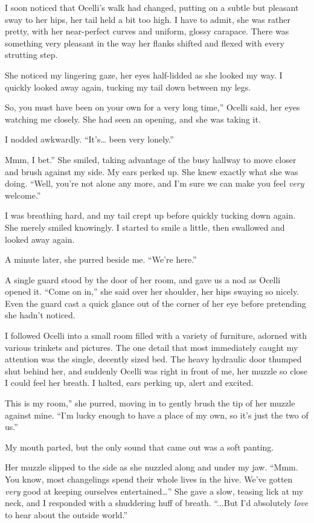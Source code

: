 I soon noticed that Ocelli’s walk had changed, putting on a subtle but pleasant sway to her hips, her tail held a bit too high. I have to admit, she was rather pretty, with her near-perfect curves and uniform, glossy carapace. There was something very pleasant in the way her flanks shifted and flexed with every strutting step.

She noticed my lingering gaze, her eyes half-lidded as she looked my way. I quickly looked away again, tucking my tail down between my legs.

\leavevmode{}So, you must have been on your own for a very long time,” Ocelli said, her eyes watching me closely. She had seen an opening, and she was taking it.

I nodded awkwardly. “It’s… been very lonely.”

\leavevmode{}Mmm, I bet.” She smiled, taking advantage of the busy hallway to move closer and brush against my side. My ears perked up. She knew exactly what she was doing. “Well, you’re not alone any more, and I’m sure we can make you feel \textit{very} welcome.”

I was breathing hard, and my tail crept up before quickly tucking down again. She merely smiled knowingly. I started to smile a little, then swallowed and looked away again.

A minute later, she purred beside me. “We’re here.”

A single guard stood by the door of her room, and gave us a nod as Ocelli opened it. “Come on in,” she said over her shoulder, her hips swaying so nicely. Even the guard cast a quick glance out of the corner of her eye before pretending she hadn’t noticed.

I followed Ocelli into a small room filled with a variety of furniture, adorned with various trinkets and pictures. The one detail that most immediately caught my attention was the single, decently sized bed. The heavy hydraulic door thumped shut behind her, and suddenly Ocelli was right in front of me, her muzzle so close I could feel her breath. I halted, ears perking up, alert and excited.

\leavevmode{}This is my room,” she purred, moving in to gently brush the tip of her muzzle against mine. “I’m lucky enough to have a place of my own, so it’s just the two of us.”

My mouth parted, but the only sound that came out was a soft panting.

Her muzzle slipped to the side as she nuzzled along and under my jaw. “Mmm. You know, most changelings spend their whole lives in the hive. We’ve gotten \textit{very} good at keeping ourselves entertained…” She gave a slow, teasing lick at my neck, and I responded with a shuddering huff of breath. “...But I’d absolutely \textit{love} to hear about the outside world.”

